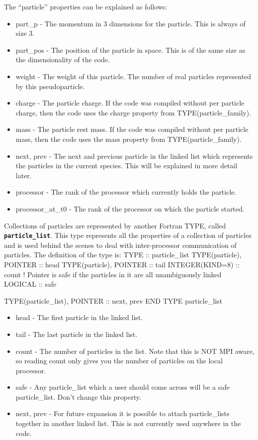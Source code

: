 \documentclass[12pt,a4paper]{article}
\newcommand{\inlinecode}[1]{{\color{warwickred} \bf\texttt{#1}}}
\newenvironment{boxverbatim}{\lboxverbatim{none}}{\endlboxverbatim}
\begin{document}
The ``particle'' properties can be explained as follows:
\begin{itemize}
\item part\_p - The momentum in 3 dimensions for the particle. This is always
  of size 3.
\item part\_pos - The position of the particle in space. This is of the same
  size as the dimensionality of the code.
\item weight - The weight of this particle. The number of real particles
  represented by this pseudoparticle.
\item charge - The particle charge. If the code was compiled without per
  particle charge, then the code uses the charge property from
  TYPE(particle\_family).
\item mass - The particle rest mass. If the code was compiled without per
  particle mass, then the code uses the mass property from
  TYPE(particle\_family).
\item next, prev - The next and previous particle in the linked list which
  represents the particles in the current species. This will be explained in
  more detail later.
\item processor - The rank of the processor which currently holds the
  particle.
\item processor\_at\_t0 - The rank of the processor on which the particle
  started.
\end{itemize}

Collections of particles are represented by another Fortran TYPE, called
\inlinecode{particle\_list}. This type represents all the properties of a
collection of particles and is used behind the scenes to deal with
inter-processor communication of particles. The definition of the type is:
\begin{boxverbatim}
  TYPE :: particle_list
    TYPE(particle), POINTER :: head
    TYPE(particle), POINTER :: tail
    INTEGER(KIND=8) :: count
    ! Pointer is safe if the particles in it are all unambiguously linked
    LOGICAL :: safe

    TYPE(particle_list), POINTER :: next, prev
  END TYPE particle_list
\end{boxverbatim}
\begin{itemize}
\item head - The first particle in the linked list.
\item tail - The last particle in the linked list.
\item count - The number of particles in the list. Note that this is NOT MPI
  aware, so reading count only gives you the number of particles on the local
  processor.
\item safe - Any particle\_list which a user should come across will be a safe
  particle\_list. Don't change this property.
\item next, prev - For future expansion it is possible to attach particle\_lists
  together in another linked list. This is not currently used anywhere in the
  code.
\end{itemize}
\end{document}
